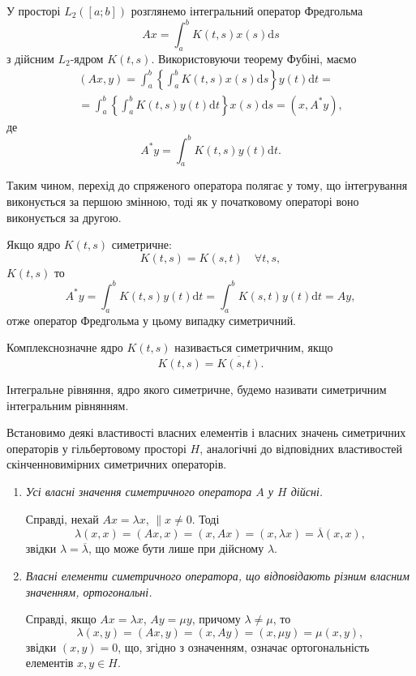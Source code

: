 \documentclass[14pt,twoside]{extreport}
\theoremstyle{mystyle}
\numberwithin{equation}{chapter}
\begin{document}
У просторі $L_2([a; b])$ розглянемо інтегральний оператор Фредгольма
\[
Ax = \int_{a}^{b}K(t, s) x(s) \mathrm{d}s
\]
з дійсним $L_2$-ядром $K(t, s)$. Використовуючи теорему Фубіні, маємо
\begin{multline*}
(Ax, y) = \int_{a}^{b}\left\{\int_{a}^{b}K(t, s) x(s) \mathrm{d}s \right\}y(t)\mathrm{d}t =\\
=\int_{a}^{b}\left\{\int_{a}^{b}K(t, s) y(t) \mathrm{d}t \right\}x(s)\mathrm{d}s = (x, A^* y),
\end{multline*}
де
\[
A^* y = \int_{a}^{b} K(t, s) y(t) \mathrm{d}t.
\]

Таким чином, перехід до спряженого оператора полягає у тому, що інтегрування виконується за першою змінною, тоді як у початковому операторі воно виконується за другою.

Якщо ядро $K(t, s)$ симетричне:
\[
K(t, s) = K(s, t) \quad \forall t,s,
\] $K(t, s)$
то
\[
A^* y = \int_{a}^{b} K(t, s) y(t) \mathrm{d}t = \int_{a}^{b} K(s, t) y(t) \mathrm{d}t = Ay,
\]
отже оператор Фредгольма у цьому випадку симетричний.

Комплекснозначне ядро $K(t, s)$ називається симетричним, якщо
\[
K(t, s) = \overline{K(s, t)}.
\]

Інтегральне рівняння, ядро якого симетричне, будемо називати симетричним інтегральним рівнянням.

Встановимо деякі властивості власних елементів і власних значень симетричних операторів у гільбертовому просторі $H$, аналогічні до відповідних властивостей скінченновимірних симетричних операторів.
\begin{enumerate}
 \item \emph{Усі власні значення симетричного оператора $A$ у $H$ дійсні.}

 Справді, нехай $Ax = \lambda x$, $\|x\neq 0$. Тоді
 \[
  \lambda (x, x) = (Ax, x) = (x, Ax) = (x, \lambda x) = \overline{\lambda} (x, x),
 \]
 звідки $\lambda = \overline{\lambda}$, що може бути лише при дійсному $\lambda$.

 \item \emph{Власні елементи симетричного оператора, що відповідають різним власним значенням, ортогональні.}

 Справді, якщо $Ax = \lambda x$, $A y = \mu y$, причому $\lambda \neq \mu$, то
 \[
  \lambda (x, y) = (Ax, y) = (x, Ay) = (x, \mu y) = \mu (x, y),
 \]
 звідки $(x, y) = 0$, що, згідно з означенням, означає ортогональність елементів $x, y \in H$.
\end{enumerate}
\end{document}
